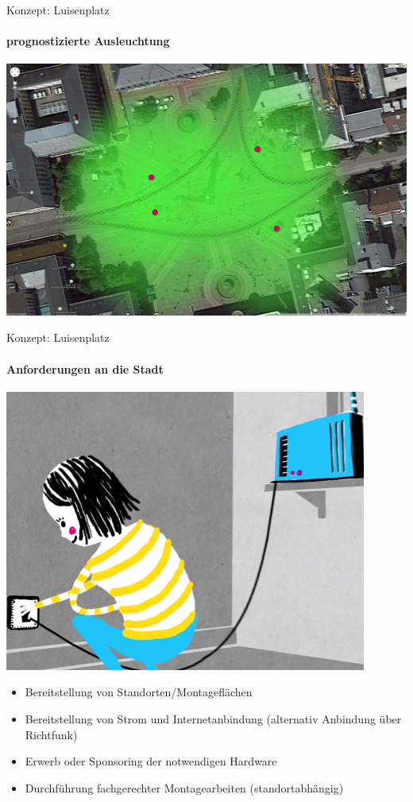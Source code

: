 \documentclass{beamer}
\begin{document}
\begin{frame}{Konzept: Luisenplatz}
\framesubtitle{prognostizierte Ausleuchtung}
\includegraphics[height=0.75\textheight]{images/plan_luisenplatz3.jpg}
\end{frame}

\begin{frame}{Konzept: Luisenplatz}
\framesubtitle{Anforderungen an die Stadt}
\vfill
\begin{center}
\includegraphics[height=0.4\textheight]{../global/images/freifunk_setup}$\;$
\vfill
\end{center}
\begin{itemize}
\item Bereitstellung von Standorten/Montageflächen
\item Bereitstellung von Strom und Internetanbindung (alternativ Anbindung über Richtfunk)
\item Erwerb oder Sponsoring der notwendigen Hardware
\item Durchführung fachgerechter Montagearbeiten (standortabhängig)
\end{itemize}
\vfill
\end{frame}
\end{document}
